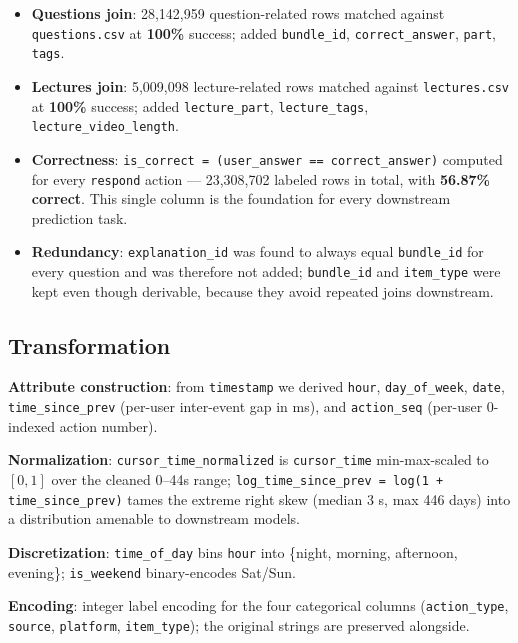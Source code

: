 \begin{itemize}
\setlength\itemsep{1pt}
\item \textbf{Questions join}: 28{,}142{,}959 question-related rows
  matched against \texttt{questions.csv} at \textbf{100\%} success;
  added \texttt{bundle\_id}, \texttt{correct\_answer}, \texttt{part},
  \texttt{tags}.
\item \textbf{Lectures join}: 5{,}009{,}098 lecture-related rows
  matched against \texttt{lectures.csv} at \textbf{100\%} success;
  added \texttt{lecture\_part}, \texttt{lecture\_tags},
  \texttt{lecture\_video\_length}.
\item \textbf{Correctness}: \texttt{is\_correct =
  (user\_answer == correct\_answer)} computed for every
  \texttt{respond} action — 23{,}308{,}702 labeled rows in total,
  with \textbf{56.87\% correct}. This single column is the foundation
  for every downstream prediction task.
\item \textbf{Redundancy}: \texttt{explanation\_id} was found to
  always equal \texttt{bundle\_id} for every question and was therefore
  not added; \texttt{bundle\_id} and \texttt{item\_type} were kept
  even though derivable, because they avoid repeated joins downstream.
\end{itemize}

\subsection{Transformation}

\textbf{Attribute construction}: from \texttt{timestamp} we derived
\texttt{hour}, \texttt{day\_of\_week}, \texttt{date},
\texttt{time\_since\_prev} (per-user inter-event gap in ms), and
\texttt{action\_seq} (per-user 0-indexed action number).

\textbf{Normalization}: \texttt{cursor\_time\_normalized} is
\texttt{cursor\_time} min-max-scaled to $[0, 1]$ over the cleaned
0--44s range; \texttt{log\_time\_since\_prev = log(1 +
time\_since\_prev)} tames the extreme right skew (median 3 s,
max 446 days) into a distribution amenable to downstream models.

\textbf{Discretization}: \texttt{time\_of\_day} bins \texttt{hour}
into \{night, morning, afternoon, evening\}; \texttt{is\_weekend}
binary-encodes Sat/Sun.

\textbf{Encoding}: integer label encoding for the four categorical
columns (\texttt{action\_type}, \texttt{source}, \texttt{platform},
\texttt{item\_type}); the original strings are preserved alongside.

